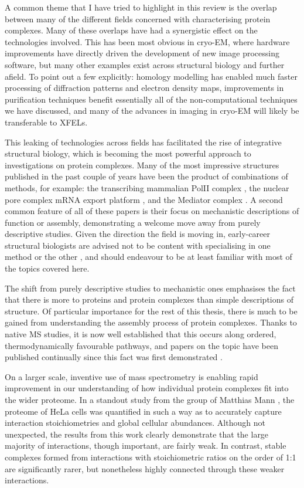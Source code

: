 \documentclass[a4paper,11pt,twoside,openright]{scrbook}
\begin{document}
A common theme that I have tried to highlight in this review is the overlap between many of the different fields concerned with characterising protein complexes. Many of these overlaps have had a synergistic effect on the technologies involved. This has been most obvious in cryo-EM, where hardware improvements have directly driven the development of new image processing software, but many other examples exist across structural biology and further afield. To point out a few explicitly: homology modelling has enabled much faster processing of diffraction patterns and electron density maps, improvements in purification techniques benefit essentially all of the non-computational techniques we have discussed, and many of the advances in imaging in cryo-EM will likely be transferable to XFELs.

This leaking of technologies across fields has facilitated the rise of integrative structural biology, which is becoming the most powerful approach to investigations on protein complexes. Many of the most impressive structures published in the past couple of years have been the product of combinations of methods, for example: the transcribing mammalian PolII complex \cite{Bernecky2016}, the nuclear pore complex mRNA export platform \cite{Fernandez-Martinez2016}, and the Mediator complex \cite{Tsai2017}. A second common feature of all of these papers is their focus on mechanistic descriptions of function or assembly, demonstrating a welcome move away from purely descriptive studies. Given the direction the field is moving in, early-career structural biologists are advised not to be content with specialising in one method or the other \cite{Shi2014,Cassiday2014}, and should endeavour to be at least familiar with most of the topics covered here.

The shift from purely descriptive studies to mechanistic ones emphasises the fact that there is more to proteins and protein complexes than simple descriptions of structure. Of particular importance for the rest of this thesis, there is much to be gained from understanding the assembly process of protein complexes. Thanks to native MS studies, it is now well established that this occurs along ordered, thermodynamically favourable pathways, and papers on the topic have been published continually since this fact was first demonstrated \cite{Levy2008,Marsh2013,Appolaire2014,Macek2017,Mallik2017}.

On a larger scale, inventive use of mass spectrometry is enabling rapid improvement in our understanding of how individual protein complexes fit into the wider proteome. In a standout study from the group of Matthias Mann \cite{Hein2015}, the proteome of HeLa cells was quantified in such a way as to accurately capture interaction stoichiometries and global cellular abundances. Although not unexpected, the results from this work clearly demonstrate that the large majority of interactions, though important, are fairly weak. In contrast, stable complexes formed from interactions with stoichiometric ratios on the order of 1:1 are significantly rarer, but nonetheless highly connected through these weaker interactions.
\end{document}
